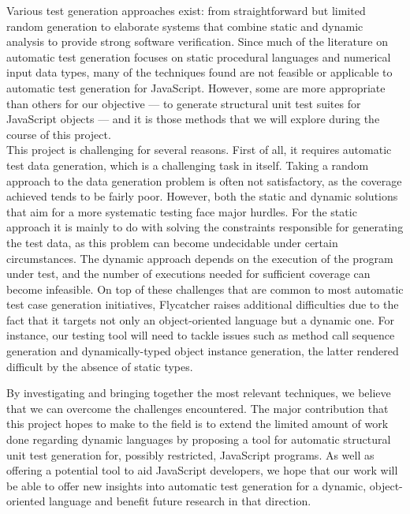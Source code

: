 \documentclass[a4paper,11pt,titlepage]{report}
\begin{document}
Various test generation approaches exist: from straightforward but limited random generation to elaborate systems that combine static and dynamic analysis to provide strong software verification. Since much of the literature on automatic test generation focuses on static procedural languages and numerical input data types, many of the techniques found are not feasible or applicable to automatic test generation for JavaScript. However, some are more appropriate than others for our objective --- to generate structural unit test suites for JavaScript objects --- and it is those methods that we will explore during the course of this project.\\

This project is challenging for several reasons. First of all, it requires automatic test data generation, which is a challenging task in itself. Taking a random approach to the data generation problem is often not satisfactory, as the coverage achieved tends to be fairly poor. However, both the static and dynamic solutions that aim for a more systematic testing face major hurdles. For the static approach it is mainly to do with solving the constraints responsible for generating the test data, as this problem can become undecidable under certain circumstances. The dynamic approach depends on the execution of the program under test, and the number of executions needed for sufficient coverage can become infeasible. On top of these challenges that are common to most automatic test case generation initiatives, \textsf{Flycatcher} raises additional difficulties due to the fact that it targets not only an object-oriented language but a dynamic one. For instance, our testing tool will need to tackle issues such as method call sequence generation and dynamically-typed object instance generation, the latter rendered difficult by the absence of static types.

By investigating and bringing together the most relevant techniques, we believe that we can overcome the challenges encountered. The major contribution that this project hopes to make to the field is to extend the limited amount of work done regarding dynamic languages by proposing a tool for automatic structural unit test generation for, possibly restricted, JavaScript programs. As well as offering a potential tool to aid JavaScript developers, we hope that our work will be able to offer new insights into automatic test generation for a dynamic, object-oriented language and benefit future research in that direction.
\end{document}
